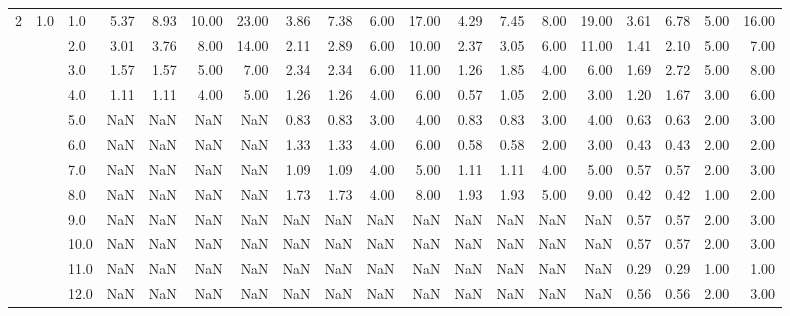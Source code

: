 \begin{tabular}{lllrrrrrrrrrrrrrrrr}
2 & 1.0 & 1.0  &       5.37 &      8.93 & 10.00 &  23.00 &       3.86 &      7.38 & 6.00 &  17.00 &       4.29 &      7.45 & 8.00 &  19.00 &       3.61 &      6.78 & 5.00 &  16.00 \\
     &     & 2.0  &       3.01 &      3.76 &  8.00 &  14.00 &       2.11 &      2.89 & 6.00 &  10.00 &       2.37 &      3.05 & 6.00 &  11.00 &       1.41 &      2.10 & 5.00 &   7.00 \\
     &     & 3.0  &       1.57 &      1.57 &  5.00 &   7.00 &       2.34 &      2.34 & 6.00 &  11.00 &       1.26 &      1.85 & 4.00 &   6.00 &       1.69 &      2.72 & 5.00 &   8.00 \\
     &     & 4.0  &       1.11 &      1.11 &  4.00 &   5.00 &       1.26 &      1.26 & 4.00 &   6.00 &       0.57 &      1.05 & 2.00 &   3.00 &       1.20 &      1.67 & 3.00 &   6.00 \\
     &     & 5.0  &        NaN &       NaN &   NaN &    NaN &       0.83 &      0.83 & 3.00 &   4.00 &       0.83 &      0.83 & 3.00 &   4.00 &       0.63 &      0.63 & 2.00 &   3.00 \\
     &     & 6.0  &        NaN &       NaN &   NaN &    NaN &       1.33 &      1.33 & 4.00 &   6.00 &       0.58 &      0.58 & 2.00 &   3.00 &       0.43 &      0.43 & 2.00 &   2.00 \\
     &     & 7.0  &        NaN &       NaN &   NaN &    NaN &       1.09 &      1.09 & 4.00 &   5.00 &       1.11 &      1.11 & 4.00 &   5.00 &       0.57 &      0.57 & 2.00 &   3.00 \\
     &     & 8.0  &        NaN &       NaN &   NaN &    NaN &       1.73 &      1.73 & 4.00 &   8.00 &       1.93 &      1.93 & 5.00 &   9.00 &       0.42 &      0.42 & 1.00 &   2.00 \\
     &     & 9.0  &        NaN &       NaN &   NaN &    NaN &        NaN &       NaN &  NaN &    NaN &        NaN &       NaN &  NaN &    NaN &       0.57 &      0.57 & 2.00 &   3.00 \\
     &     & 10.0 &        NaN &       NaN &   NaN &    NaN &        NaN &       NaN &  NaN &    NaN &        NaN &       NaN &  NaN &    NaN &       0.57 &      0.57 & 2.00 &   3.00 \\
     &     & 11.0 &        NaN &       NaN &   NaN &    NaN &        NaN &       NaN &  NaN &    NaN &        NaN &       NaN &  NaN &    NaN &       0.29 &      0.29 & 1.00 &   1.00 \\
     &     & 12.0 &        NaN &       NaN &   NaN &    NaN &        NaN &       NaN &  NaN &    NaN &        NaN &       NaN &  NaN &    NaN &       0.56 &      0.56 & 2.00 &   3.00 \\

\end{tabular}
